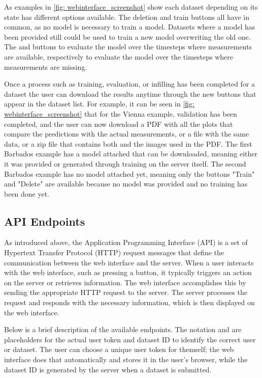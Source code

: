 As examples in \autoref{fig: webinterface_screenshot} show each dataset depending on its state has different options available.
The deletion and train buttons all have in common, as no model is necessary to train a model.
Datasets where a model has been provided still could be used to train a new model overwriting the old one.
The  and  buttons to evaluate the model over the timesteps where measurements are available, respectively to evaluate the model over the timesteps where measurements are missing.

Once a process such as training, evaluation, or infilling has been completed for a dataset the user can download the results anytime through the new buttons that appear in the dataset list.
For example, it can be seen in \autoref{fig: webinterface_screenshot} that for the Vienna example, validation has been completed, and the user can now download a PDF with all the plots that compare the predictions with the actual measurements, or a  file with the same data, or a zip file that contains both and the images used in the PDF.
The first Barbados example has a model attached that can be downloaded, meaning either it was provided or generated through training on the server itself.
The second Barbados example has no model attached yet, meaning only the buttons "Train" and "Delete" are available because no model was provided and no training has been done yet.

\subsection{API Endpoints}
\label{sec: api}

As introduced above, the Application Programming Interface (API) is a set of Hypertext Transfer Protocol (HTTP) request messages that define the communication between the web interface and the server.
When a user interacts with the web interface, such as pressing a button, it typically triggers an action on the server or retrieves information. The web interface accomplishes this by sending the appropriate HTTP request to the server. The server processes the request and responds with the necessary information, which is then displayed on the web interface.

Below is a brief description of the available endpoints. The notation  and  are placeholders for the actual user token and dataset ID to identify the correct user or dataset. The user can choose a unique user token for themself; the web interface does that automatically and stores it in the user's browser, while the dataset ID is generated by the server when a dataset is submitted.

